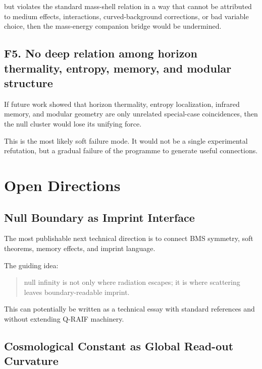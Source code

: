 \documentclass[12pt,a4paper]{article}
\theoremstyle{definition}
\theoremstyle{remark}
\begin{document}
but violates the standard mass-shell relation in a way that cannot be
attributed to medium effects, interactions, curved-background
corrections, or bad variable choice, then the mass-energy companion
bridge would be undermined.

\subsection{F5. No deep relation among horizon thermality, entropy,
memory, and modular
structure}\label{f5.-no-deep-relation-among-horizon-thermality-entropy-memory-and-modular-structure}

If future work showed that horizon thermality, entropy localization,
infrared memory, and modular geometry are only unrelated special-case
coincidences, then the null cluster would lose its unifying force.

This is the most likely soft failure mode. It would not be a single
experimental refutation, but a gradual failure of the programme to
generate useful connections.

\section{Open Directions}\label{open-directions}

\subsection{Null Boundary as Imprint
Interface}\label{null-boundary-as-imprint-interface}

The most publishable next technical direction is to connect BMS
symmetry, soft theorems, memory effects, and imprint language.

The guiding idea:

\begin{quote}
null infinity is not only where radiation escapes; it is where
scattering leaves boundary-readable imprint.
\end{quote}

This can potentially be written as a technical essay with standard
references and without extending Q-RAIF machinery.

\subsection{Cosmological Constant as Global Read-out
Curvature}\label{cosmological-constant-as-global-read-out-curvature}
\end{document}
